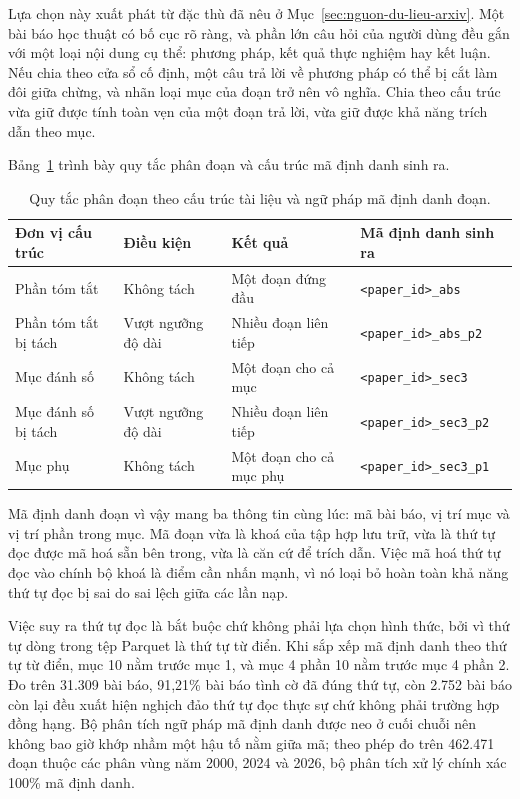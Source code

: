 Lựa chọn này xuất phát từ đặc thù đã nêu ở Mục~\ref{sec:nguon-du-lieu-arxiv}. Một bài báo học thuật có bố cục rõ ràng, và phần lớn câu hỏi của người dùng đều gắn với một loại nội dung cụ thể: phương pháp, kết quả thực nghiệm hay kết luận. Nếu chia theo cửa sổ cố định, một câu trả lời về phương pháp có thể bị cắt làm đôi giữa chừng, và nhãn loại mục của đoạn trở nên vô nghĩa. Chia theo cấu trúc vừa giữ được tính toàn vẹn của một đoạn trả lời, vừa giữ được khả năng trích dẫn theo mục.

Bảng~\ref{tab:quy-tac-phan-doan} trình bày quy tắc phân đoạn và cấu trúc mã định danh sinh ra.

\begin{table}[htbp]
    \centering
    \caption{Quy tắc phân đoạn theo cấu trúc tài liệu và ngữ pháp mã định danh đoạn.}
    \label{tab:quy-tac-phan-doan}
    \small
    \begin{tabularx}{\textwidth}{@{}>{\raggedright\arraybackslash}p{3.4cm}>{\raggedright\arraybackslash}p{2.9cm}>{\raggedright\arraybackslash}p{3.9cm}>{\raggedright\arraybackslash}X@{}}
        \toprule
        \textbf{Đơn vị cấu trúc} & \textbf{Điều kiện} & \textbf{Kết quả} & \textbf{Mã định danh sinh ra} \\
        \midrule
        Phần tóm tắt & Không tách & Một đoạn đứng đầu & \texttt{<paper\_id>\_abs} \\
        Phần tóm tắt bị tách & Vượt ngưỡng độ dài & Nhiều đoạn liên tiếp & \texttt{<paper\_id>\_abs\_p2} \\
        Mục đánh số & Không tách & Một đoạn cho cả mục & \texttt{<paper\_id>\_sec3} \\
        Mục đánh số bị tách & Vượt ngưỡng độ dài & Nhiều đoạn liên tiếp & \texttt{<paper\_id>\_sec3\_p2} \\
        Mục phụ & Không tách & Một đoạn cho cả mục phụ & \texttt{<paper\_id>\_sec3\_p1} \\
        \bottomrule
    \end{tabularx}
\end{table}

Mã định danh đoạn vì vậy mang ba thông tin cùng lúc: mã bài báo, vị trí mục và vị trí phần trong mục. Mã đoạn vừa là khoá của tập hợp lưu trữ, vừa là thứ tự đọc được mã hoá sẵn bên trong, vừa là căn cứ để trích dẫn. Việc mã hoá thứ tự đọc vào chính bộ khoá là điểm cần nhấn mạnh, vì nó loại bỏ hoàn toàn khả năng thứ tự đọc bị sai do sai lệch giữa các lần nạp.

Việc suy ra thứ tự đọc là bắt buộc chứ không phải lựa chọn hình thức, bởi vì thứ tự dòng trong tệp Parquet là thứ tự từ điển. Khi sắp xếp mã định danh theo thứ tự từ điển, mục 10 nằm trước mục 1, và mục 4 phần 10 nằm trước mục 4 phần 2. Đo trên 31.309 bài báo, 91,21\% bài báo tình cờ đã đúng thứ tự, còn 2.752 bài báo còn lại đều xuất hiện nghịch đảo thứ tự đọc thực sự chứ không phải trường hợp đồng hạng. Bộ phân tích ngữ pháp mã định danh được neo ở cuối chuỗi nên không bao giờ khớp nhầm một hậu tố nằm giữa mã; theo phép đo trên 462.471 đoạn thuộc các phân vùng năm 2000, 2024 và 2026, bộ phân tích xử lý chính xác 100\% mã định danh.

